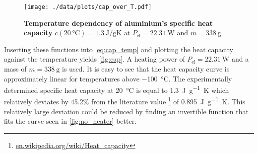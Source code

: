 \begin{figure}[tbp]
	\centering
	\texttt{[image: ./data/plots/cap\_over\_T.pdf]}
	\caption[Temperature dependency of aluminium's specific heat capacity]{\textbf{Temperature dependency of aluminium's specific heat capacity} $c(\SI{20}{\celsius})=\SI{1.3}{\joule\per\gram\kelvin}$ at $P_\text{el}=\SI{22.31}{\watt}$ and $m=\SI{338}{\gram}$}
	\label{fig:cap}
\end{figure}
Inserting these functions into \autoref{eq:cap_temp} and plotting the heat capacity against the temperature yields \autoref{fig:cap}.
A heating power of $P_\text{el}=\SI{22.31}{\watt}$ and a mass of $m=\SI{338}{\gram}$ is used.
It is easy to see that the heat capacity curve is approximately linear for temperatures above \SI{-100}{\celsius}.
The experimentally determined specific heat capacity at \SI{20}{\celsius} is equal to \SI{1.3}{\joule\per\gram\kelvin} which relatively deviates by \num{45.2}\% from the literature value \footnote{\url{en.wikipedia.org/wiki/Heat_capacity}} of \SI{0.895}{\joule\per\gram\kelvin}.
This relatively large deviation could be reduced by finding an invertible function that fits the curve seen in \autoref{fig:no_heater} better. 
